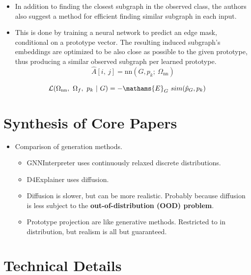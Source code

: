 \documentclass[
  11pt,
  letterpaper,
]{article}
\providecommand{\tightlist}{%
  \setlength{\itemsep}{0pt}\setlength{\parskip}{0pt}}\usepackage{longtable,booktabs,array}
\begin{document}
\begin{itemize}
  \begin{itemize}
  \item
    In addition to finding the closest subgraph in the observed class,
    the authors also suggest a method for efficient finding similar
    subgraph in each input.
  \item
    This is done by training a neural network to predict an edge mask,
    conditional on a prototype vector. The resulting induced subgraph's
    embeddings are optimized to be also close as possible to the given
    prototype, thus producing a similar observed subgraph per learned
    prototype. \begin{equation}
      \hat A[i, \ j] = \text{nn}\left(G, p_k; \ \Omega_{\text{nn}}\right)
      \end{equation}
  \end{itemize}

  \begin{equation}
        \mathcal{L}(\Omega_{\text{nn}}, \ \Omega_f, \ p_k \ | \ G) = -\mathams{E}_G \ sim(\hat p_G, p_k) 
    \end{equation}
\end{itemize}

\hypertarget{synthesis-of-core-papers}{%
\section{Synthesis of Core Papers}\label{synthesis-of-core-papers}}

\begin{itemize}
\tightlist
\item
  Comparison of generation methods.

  \begin{itemize}
  \tightlist
  \item
    GNNInterpreter uses continuously relaxed discrete distributions.
  \item
    D4Explainer uses diffusion.
  \item
    Diffusion is slower, but can be more realistic. Probably because
    diffusion is less subject to the \textbf{out-of-distribution (OOD)
    problem}.
  \item
    Prototype projection are like generative methods. Restricted to in
    distribution, but realism is all but guaranteed.
  \end{itemize}
\end{itemize}

\hypertarget{technical-details}{%
\section{Technical Details}\label{technical-details}}
\end{document}
